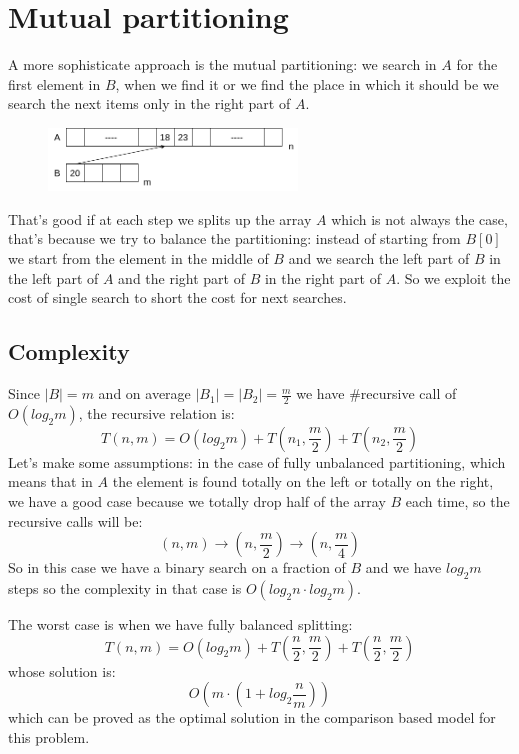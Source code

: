 \section{Mutual partitioning}
A more sophisticate approach is the mutual partitioning: we search in $A$ for the first element in $B$, when we find it or we find the place in which it should be we search the next items only in the right part of $A$.
\begin{figure}[H]
    \centering
    \includegraphics[width=250px]{images/6_Set_intersection/mutual_partitioning.png}
\end{figure}

That's good if at each step we splits up the array $A$ which is not always the case, that's because we try to balance the partitioning: instead of starting from $B[0]$ we start from the element in the middle of $B$ and we search the left part of $B$ in the left part of $A$ and the right part of $B$ in the right part of $A$.
So we exploit the cost of single search to short the cost for next searches.

\subsection{Complexity}
Since $|B| = m$ and on average $|B_1|=|B_2| = \frac{m}{2}$ we have $\#$recursive call of $O(log_2 m)$, the recursive relation is:
$$
    T(n, m) = O(log_2 m) + T\left(n_1, \frac{m}{2}\right) + T\left(n_2, \frac{m}{2}\right)
$$
Let's make some assumptions: in the case of fully unbalanced partitioning, which means that in $A$ the element is found totally on the left or totally on the right, we have a good case because we totally drop half of the array $B$ each time, so the recursive calls will be:
$$
    (n, m) \xrightarrow{} \left(n, \frac{m}{2}\right) \xrightarrow{} \left(n, \frac{m}{4}\right) 
$$
So in this case we have a binary search on a fraction of $B$ and we have $log_2 m$ steps so the complexity in that case is $O(log_2 n \cdot log_2 m)$.

The worst case is when we have fully balanced splitting:
$$
    T(n,m) = O(log_2 m) + T(\frac{n}{2}, \frac{m}{2}) + T(\frac{n}{2}, \frac{m}{2})
$$
whose solution is:
$$
    O\left( m \cdot \left( 1 + log_2 \frac{n}{m} \right) \right)
$$
which can be proved as the optimal solution in the comparison based model for this problem.

